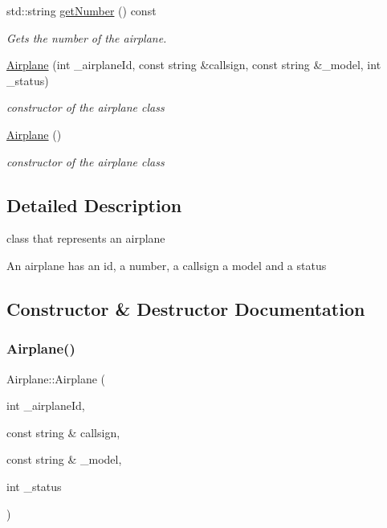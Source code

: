 \begin{DoxyCompactItemize}
std\+::string \mbox{\hyperlink{class_airplane_a29068c4308e9aef5f8d944840b4dba10}{get\+Number}} () const
\begin{DoxyCompactList}\small\item\em Gets the number of the airplane. \end{DoxyCompactList}\item 
\mbox{\hyperlink{class_airplane_ac93ed55d98af8ba9093ead82378da1dd}{Airplane}} (int \+\_\+airplane\+Id, const string \&callsign, const string \&\+\_\+model, int \+\_\+status)
\begin{DoxyCompactList}\small\item\em constructor of the airplane class \end{DoxyCompactList}\item 
\mbox{\hyperlink{class_airplane_afccae36e3013e038d51504cea1a98219}{Airplane}} ()
\begin{DoxyCompactList}\small\item\em constructor of the airplane class \end{DoxyCompactList}\end{DoxyCompactItemize}


\subsection{Detailed Description}
class that represents an airplane 

An airplane has an id, a number, a callsign a model and a status 

\subsection{Constructor \& Destructor Documentation}
\mbox{\label{class_airplane_ac93ed55d98af8ba9093ead82378da1dd}} 
\subsubsection{\texorpdfstring{Airplane()}{Airplane()}\hspace{0.1cm}{\footnotesize\ttfamily [1/2]}}
{\footnotesize\ttfamily Airplane\+::\+Airplane (\begin{DoxyParamCaption}\item[{int}]{\+\_\+airplane\+Id,  }\item[{const string \&}]{callsign,  }\item[{const string \&}]{\+\_\+model,  }\item[{int}]{\+\_\+status }\end{DoxyParamCaption})}



